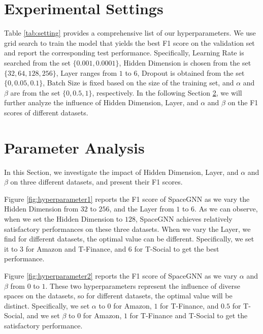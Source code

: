 \section{Experimental Settings}
\label{subsec:setting}



Table \ref{tab:setting} provides a comprehensive list of our hyperparameters. We use grid search to train the model that yields the best F1 score on the validation set and report the corresponding test performance. Specifically, Learning Rate is searched from the set $\{0.001, 0.0001\}$, Hidden Dimension is chosen from the set $\{32, 64, 128, 256\}$, Layer ranges from $1$ to $6$, Dropout is obtained from the set $\{0, 0.05, 0.1\}$, Batch Size is fixed based on the size of the training set, and $\alpha$ and $\beta$ are from the set $\{0, 0.5, 1\}$, respectively. In the following Section \ref{subsec:parameter}, we will further analyze the influence of Hidden Dimension, Layer, and $\alpha$ and $\beta$ on the F1 scores of different datasets. 

\section{Parameter Analysis}
\label{subsec:parameter}


In this Section, we investigate the impact of Hidden Dimension, Layer, and $\alpha$ and $\beta$ on three different datasets, and present their F1 scores. 

Figure \ref{fig:hyperparameter1} reports the F1 score of SpaceGNN as we vary the Hidden Dimension from $32$ to $256$, and the Layer from $1$ to $6$. As we can observe, when we set the Hidden Dimension to $128$, SpaceGNN achieves relatively satisfactory performances on these three datasets. When we vary the Layer, we find for different datasets, the optimal value can be different. Specifically, we set it to $3$ for Amazon and T-Finance, and $6$ for T-Social to get the best performance. 

Figure \ref{fig:hyperparameter2} reports the F1 score of SpaceGNN as we vary $\alpha$ and $\beta$ from $0$ to $1$. These two hyperparameters represent the influence of diverse spaces on the datasets, so for different datasets, the optimal value will be distinct. Specifically, we set $\alpha$ to $0$ for Amazon, $1$ for T-Finance, and $0.5$ for T-Social, and we set $\beta$ to $0$ for Amazon, $1$ for T-Finance and T-Social to get the satisfactory performance. 

